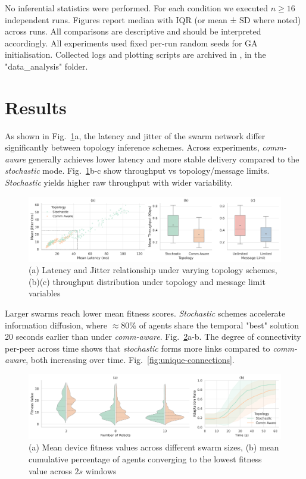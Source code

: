 \documentclass[conference]{IEEEtran}
\begin{document}
No inferential statistics were performed. For each condition we executed $n\geq16$ independent runs. Figures report median with IQR (or mean ± SD where noted) across runs. All comparisons are descriptive and should be interpreted accordingly. All experiments used fixed per-run random seeds for GA initialisation. Collected logs and plotting scripts are archived in \cite{yallico_httpsgithubcomyallicorobotics_dissertation_2025}, in the "data\_analysis" folder. \\

\section{Results}\label{sec:results}
As shown in Fig.~\ref{fig:topology}a, the latency and jitter of the swarm network differ significantly between topology inference schemes. Across experiments, \emph{comm-aware} generally achieves lower latency and more stable delivery compared to the \emph{stochastic} mode. Fig.~\ref{fig:topology}b-c show throughput vs topology/message limits. \emph{Stochastic} yields higher raw throughput with wider variability. \\

\begin{figure}[h]
    \centering
    \includegraphics[width=1\textwidth]{topology_impact.pdf}
    \caption{(a) Latency and Jitter relationship under varying topology schemes, (b)(c) throughput distribution under topology and message limit variables}
    \label{fig:topology}
\end{figure}

Larger swarms reach lower mean fitness scores. \emph{Stochastic} schemes accelerate information diffusion, where $\approx$80\% of agents share the temporal "best" solution 20 seconds earlier than under \emph{comm-aware}. Fig.~\ref{fig:performance}a-b. The degree of connectivity per-peer across time shows that \emph{stochastic} forms more links compared to \emph{comm-aware}, both increasing over time. Fig.~\ref{fig:unique-connections}. \\

\begin{figure}[h]
    \centering
    \includegraphics[width=1\textwidth]{performance_impact.pdf}
    \caption{(a) Mean device fitness values across different swarm sizes, (b) mean cumulative percentage of agents converging to the lowest fitness value across $2s$ windows}
    \label{fig:performance}
\end{figure}
\end{document}

